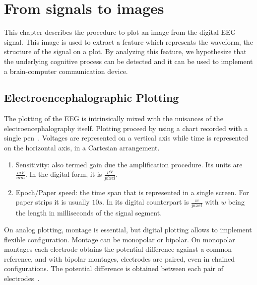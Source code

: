 \chapter{From signals to images}
\label{chapter:two}


This chapter describes the procedure to plot an image from the digital EEG signal.  This image is used to extract a feature which represents the waveform, the structure of the signal on a plot.  By analyzing this feature, we hypothesize that the underlying cognitive process can be detected and it can be used to implement a brain-computer communication device.

\section{Electroencephalographic Plotting}

The plotting of the EEG is intrinsically mixed with the nuisances of the electroencephalography itself.  Plotting proceed by using a chart recorded with a single pen~\cite{Jestico1977}.   Voltages are represented on a vertical axis while time is represented on the horizontal axis, in a Cartesian arrangement. 

\begin{enumerate}
\item Sensitivity: also termed gain due the amplification procedure.  Its units are $ \frac{mV}{mm}$.  In the digital form, it is $\frac{\mu V}{pixel}$.
\item Epoch/Paper speed: the time span that is represented in a single screen.  For paper strips it is usually $10s$.  In its digital counterpart is $ \frac{w}{pixel}$ with $w$ being the length in milliseconds of the signal segment.
\end{enumerate}

On analog plotting, montage is essential, but digital plotting allows to implement flexible configuration.  Montage can be monopolar or bipolar.  On monopolar montages each electrode obtains the potential difference against a common reference, and with bipolar montages, electrodes are paired, even in chained configurations. The potential difference is obtained between each pair of electrodes~\cite{EEGIntro}.



